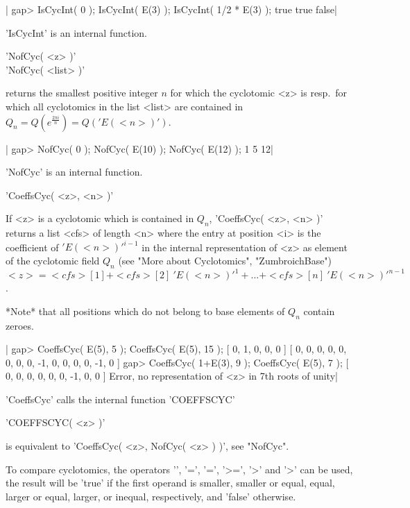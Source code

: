 |    gap> IsCycInt( 0 ); IsCycInt( E(3) ); IsCycInt( 1/2 * E(3) );
    true
    true
    false|

'IsCycInt' is an internal function.


'NofCyc( <z> )'\\
'NofCyc( <list> )'

returns the smallest positive integer $n$ for which the cyclotomic <z>
is resp.\ for  which all  cyclotomics in the list <list> are contained
in $Q_n = Q( e^{\frac{2 \pi i}{n}} ) = Q( 'E(<n>)' )$.

|    gap> NofCyc( 0 ); NofCyc( E(10) ); NofCyc( E(12) );
    1
    5
    12|

'NofCyc' is an internal function.


'CoeffsCyc( <z>, <n> )'

If <z> is a cyclotomic which is contained in  $Q_n$, 'CoeffsCyc(  <z>,
<n> )' returns a list <cfs> of length  <n> where the entry at position
<i>  is  the   coefficient   of   $'E(<n>)'^{i-1}$   in  the  internal
representation  of  <z> as element  of the cyclotomic field $Q_n$ (see
"More  about  Cyclotomics",  "ZumbroichBase")\:\
$<z> = <cfs>[1] + <cfs>[2]\ 'E(<n>)'^1 + \ldots + <cfs>[n]\
'E(<n>)'^{n-1}$.

*Note*  that  all  positions which do not belong to  base  elements of
$Q_n$ contain zeroes.

|    gap> CoeffsCyc( E(5), 5 ); CoeffsCyc( E(5), 15 );
    [ 0, 1, 0, 0, 0 ]
    [ 0, 0, 0, 0, 0, 0, 0, 0, -1, 0, 0, 0, 0, -1, 0 ]
    gap> CoeffsCyc( 1+E(3), 9 ); CoeffsCyc( E(5), 7 );
    [ 0, 0, 0, 0, 0, 0, -1, 0, 0 ]
    Error, no representation of <z> in 7th roots of unity|

'CoeffsCyc' calls the internal function 'COEFFSCYC'\:

'COEFFSCYC( <z> )'

is equivalent to 'CoeffsCyc( <z>, NofCyc( <z> ) )', see "NofCyc".


To compare  cyclotomics, the operators '\<', '\<=', '=', '>=', '>' and
'\<>' can  be used, the result will be  'true' if the first operand is
smaller, smaller or equal, equal, larger or equal, larger, or inequal,
respectively, and 'false' otherwise.

